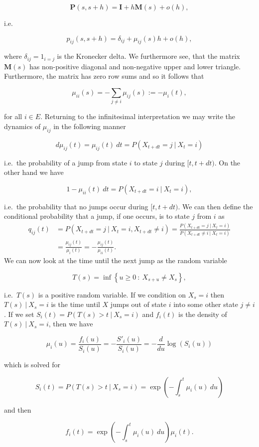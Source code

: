 \documentclass[a4paper,12pt,openany]{book}
\begin{document}
\[
\mathbf{P}(s,s+h) = \mathbf{I}+h\mathbf{M}(s)+o(h),
\]

i.e.

\[
p_{ij}(s,s+h)=\delta_{ij}+\mu_{ij}(s)h+o(h),
\]

where \(\delta_{ij}=1_{i=j}\) is the Kronecker delta. We furthermore see, that the matrix \(\mathbf{M}(s)\) has non-positive diagonal and non-negative upper and lower triangle. Furthermore, the matrix has zero row sums and so it follows that

\[
\mu_{ii}(s)=-\sum_{j\ne i}\mu_{ij}(s):=-\mu_{i}(t),
\]

for all \(i\in E\). Returning to the infinitesimal interpretation we may write the dynamics of \(\mu_{ij}\) in the following manner

\[
d\mu_{ij}(t)=\mu_{ij}(t)\ dt=P(X_{t+dt}=j\ \vert\ X_t=i)
\]

i.e.~the probability of a jump from state \(i\) to state \(j\) during \([t,t+dt)\). On the other hand we have

\[
1-\mu_{ii}(t)\ dt=P(X_{t+dt}=i\ \vert\ X_t=i),
\]

i.e.~the probability that no jumps occur during \([t,t+dt)\). We can then define the conditional probability that a jump, if one occurs, is to state \(j\) from \(i\) as
\begin{align*}
q_{ij}(t)&=P(X_{t+dt}=j\ \vert\  X_t=i,X_{t+dt}\ne i)=\frac{P(X_{t+dt}=j\ \vert\  X_t=i)}{P(X_{t+dt}\ne i\ \vert\  X_t=i)}\\
&=\frac{\mu_{ij}(t)}{\mu_i(t)}=-\frac{\mu_{ij}(t)}{\mu_{ii}(t)}.
\end{align*}
We can now look at the time until the next jump as the random variable

\[
T(s)=\inf\left\{u\ge 0\ :\ X_{s+u}\ne X_s\right\},
\]

i.e.~\(T(s)\) is a positive random variable. If we condition on \(X_s=i\) then \(T(s)\ \vert\ X_s=i\) is the time until \(X\) jumps out of state \(i\) into some other state \(j\ne i\). If we set \(S_i(t)=P(T(s)>t\ \vert\ X_s=i)\) and \(f_i(t)\) is the density of \(T(s)\ \vert\ X_s=i\), then we have

\[
\mu_i(u)=\frac{f_i(u)}{S_i(u)}=-\frac{S'_i(u)}{S_i(u)}=-\frac{d}{du}\log(S_i(u))
\]

which is solved for

\[
S_i(t)=P(T(s)>t\ \vert\ X_s=i)=\exp\left(-\int_s^t \mu_i(u)\ du\right)
\]

and then

\[
f_i(t)=\exp\left(-\int_s^t \mu_i(u)\ du\right)\mu_i(t).
\]
\end{document}

